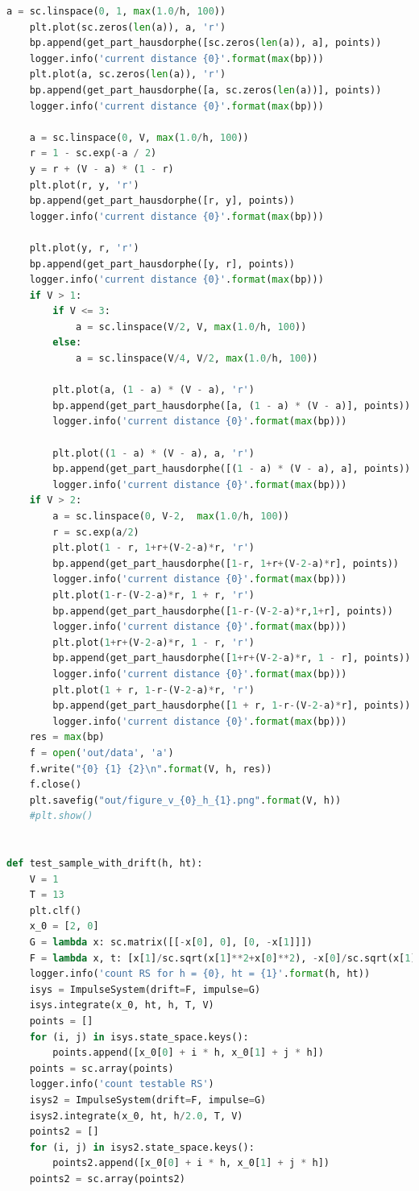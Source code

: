 \documentclass[a4paper,12pt]{article}
\begin{document}
\begin{lstlisting}[language=Python,
caption={Интерфейс Impulse System}]
    a = sc.linspace(0, 1, max(1.0/h, 100))
    plt.plot(sc.zeros(len(a)), a, 'r')
    bp.append(get_part_hausdorphe([sc.zeros(len(a)), a], points))
    logger.info('current distance {0}'.format(max(bp)))
    plt.plot(a, sc.zeros(len(a)), 'r')
    bp.append(get_part_hausdorphe([a, sc.zeros(len(a))], points))
    logger.info('current distance {0}'.format(max(bp)))

    a = sc.linspace(0, V, max(1.0/h, 100))
    r = 1 - sc.exp(-a / 2)
    y = r + (V - a) * (1 - r)
    plt.plot(r, y, 'r')
    bp.append(get_part_hausdorphe([r, y], points))
    logger.info('current distance {0}'.format(max(bp)))

    plt.plot(y, r, 'r')
    bp.append(get_part_hausdorphe([y, r], points))
    logger.info('current distance {0}'.format(max(bp)))
    if V > 1:
        if V <= 3:
            a = sc.linspace(V/2, V, max(1.0/h, 100))
        else:
            a = sc.linspace(V/4, V/2, max(1.0/h, 100))

        plt.plot(a, (1 - a) * (V - a), 'r')
        bp.append(get_part_hausdorphe([a, (1 - a) * (V - a)], points))
        logger.info('current distance {0}'.format(max(bp)))

        plt.plot((1 - a) * (V - a), a, 'r')
        bp.append(get_part_hausdorphe([(1 - a) * (V - a), a], points))
        logger.info('current distance {0}'.format(max(bp)))
    if V > 2:
        a = sc.linspace(0, V-2,  max(1.0/h, 100))
        r = sc.exp(a/2)
        plt.plot(1 - r, 1+r+(V-2-a)*r, 'r')
        bp.append(get_part_hausdorphe([1-r, 1+r+(V-2-a)*r], points))
        logger.info('current distance {0}'.format(max(bp)))
        plt.plot(1-r-(V-2-a)*r, 1 + r, 'r')
        bp.append(get_part_hausdorphe([1-r-(V-2-a)*r,1+r], points))
        logger.info('current distance {0}'.format(max(bp)))
        plt.plot(1+r+(V-2-a)*r, 1 - r, 'r')
        bp.append(get_part_hausdorphe([1+r+(V-2-a)*r, 1 - r], points))
        logger.info('current distance {0}'.format(max(bp)))
        plt.plot(1 + r, 1-r-(V-2-a)*r, 'r')
        bp.append(get_part_hausdorphe([1 + r, 1-r-(V-2-a)*r], points))
        logger.info('current distance {0}'.format(max(bp)))
    res = max(bp)
    f = open('out/data', 'a')
    f.write("{0} {1} {2}\n".format(V, h, res))
    f.close()
    plt.savefig("out/figure_v_{0}_h_{1}.png".format(V, h))
    #plt.show()


def test_sample_with_drift(h, ht):
    V = 1
    T = 13
    plt.clf()
    x_0 = [2, 0]
    G = lambda x: sc.matrix([[-x[0], 0], [0, -x[1]]])
    F = lambda x, t: [x[1]/sc.sqrt(x[1]**2+x[0]**2), -x[0]/sc.sqrt(x[1]**2+x[0]**2)]
    logger.info('count RS for h = {0}, ht = {1}'.format(h, ht))
    isys = ImpulseSystem(drift=F, impulse=G)
    isys.integrate(x_0, ht, h, T, V)
    points = []
    for (i, j) in isys.state_space.keys():
        points.append([x_0[0] + i * h, x_0[1] + j * h])
    points = sc.array(points)
    logger.info('count testable RS')
    isys2 = ImpulseSystem(drift=F, impulse=G)
    isys2.integrate(x_0, ht, h/2.0, T, V)
    points2 = []
    for (i, j) in isys2.state_space.keys():
        points2.append([x_0[0] + i * h, x_0[1] + j * h])
    points2 = sc.array(points2)
    

\end{lstlisting}
\end{document}
